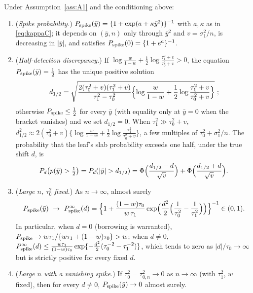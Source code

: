 \documentclass[11pt]{article}
\theoremstyle{definition}
\theoremstyle{plain}
\begin{document}
{\begin{thmA}\label{thm:T2}
Under Assumption~\ref{ass:A1} and the conditioning above:
\begin{enumerate}[label=(\alph*),leftmargin=2.2em]
\item (\emph{Spike probability.}) $P_{\mathrm{spike}}(\bar y)=\{1+\exp(a+\kappa\bar y^2)\}^{-1}$ with $a,\kappa$ as in \eqref{eq:kappaC}; it depends on $(\bar y,n)$ only through $\bar y^2$ and $v=\sigma_1^2/n$, is decreasing in $|\bar y|$, and satisfies $P_{\mathrm{spike}}(0)=\{1+e^{a}\}^{-1}$.
\item (\emph{Half-detection discrepancy.}) If $\log\frac{w}{1-w}+\frac{1}{2}\log\frac{\tau_1^2+v}{\tau_0^2+v}>0$, the equation $P_{\mathrm{spike}}(\bar y)=\tfrac12$ has the unique positive solution
\begin{equation}
d_{1/2}=\sqrt{\frac{2(\tau_0^2+v)(\tau_1^2+v)}{\tau_1^2-\tau_0^2}\Bigl\{\log\frac{w}{1-w}+\frac{1}{2}\log\frac{\tau_1^2+v}{\tau_0^2+v}\Bigr\}}\ ;
\label{eq:dhalf}
\end{equation}
otherwise $P_{\mathrm{spike}}\le\tfrac12$ for every $\bar y$ (with equality only at $\bar y=0$ when the bracket vanishes) and we set $d_{1/2}=0$. When $\tau_1^2\gg\tau_0^2+v$, $d_{1/2}^2\approx2(\tau_0^2+v)\{\log\frac{w}{1-w}+\frac{1}{2}\log\frac{\tau_1^2}{\tau_0^2+v}\}$, a few multiples of $\tau_0^2+\sigma_1^2/n$. The probability that the leaf's slab probability exceeds one half, under the true shift $d$, is
\begin{equation}
P_d\bigl(p(\bar y)>\tfrac12\bigr)=P_d(|\bar y|>d_{1/2})=\Phibar\Bigl(\frac{d_{1/2}-d}{\sqrt v}\Bigr)+\Phibar\Bigl(\frac{d_{1/2}+d}{\sqrt v}\Bigr).
\label{eq:detectprob}
\end{equation}
\item (\emph{Large $n$, $\tau_0^2$ fixed.}) As $n\to\infty$, almost surely
\begin{equation}
\Pspike(\bar y)\ \to\ \Pspike^\infty(d)=\Bigl\{1+\frac{(1-w)\tau_0}{w\,\tau_1}\exp\Bigl(\frac{d^2}{2}\Bigl(\frac{1}{\tau_0^2}-\frac{1}{\tau_1^2}\Bigr)\Bigr)\Bigr\}^{-1}\in(0,1).
\label{eq:pinf}
\end{equation}
In particular, when $d=0$ (borrowing is warranted), $P_{\mathrm{spike}}\to w\tau_1/\{w\tau_1+(1-w)\tau_0\}>w$; when $d\ne0$, $P_{\mathrm{spike}}^\infty(d)\le\frac{w\tau_1}{(1-w)\tau_0}\exp\{-\frac{d^2}{2}(\tau_0^{-2}-\tau_1^{-2})\}$, which tends to zero as $|d|/\tau_0\to\infty$ but is strictly positive for every fixed $d$.
\item (\emph{Large $n$ with a vanishing spike.}) If $\tau_0^2=\tau_{0,n}^2\to0$ as $n\to\infty$ (with $\tau_1^2$, $w$ fixed), then for every $d\ne0$, $P_{\mathrm{spike}}(\bar y)\to0$ almost surely.
\end{enumerate}
\end{thmA}

}
\end{document}
